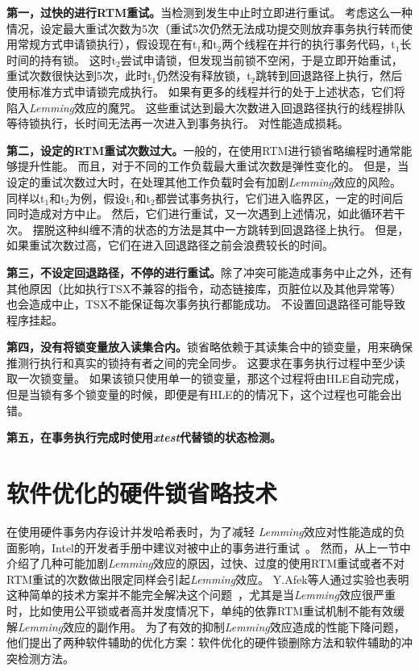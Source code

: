 \textbf{第一，过快的进行RTM重试。}当检测到发生中止时立即进行重试。
考虑这么一种情况，设定最大重试次数为5次（重试5次仍然无法成功提交则放弃事务执行转而使用常规方式申请锁执行），假设现在有t$_1$和t$_2$两个线程在并行的执行事务代码，t$_1$长时间的持有锁。
这时t$_2$尝试申请锁，但发现当前锁不空闲，于是立即开始重试，重试次数很快达到5次，此时t$_1$仍然没有释放锁，t$_2$跳转到回退路径上执行，然后使用标准方式申请锁完成执行。
如果有更多的线程并行的处于上述状态，它们将陷入\textit{Lemming}效应的魔咒。
这些重试达到最大次数进入回退路径执行的线程排队等待锁执行，长时间无法再一次进入到事务执行。
对性能造成损耗。

\textbf{第二，设定的RTM重试次数过大。}一般的，在使用RTM进行锁省略编程时通常能够提升性能。
而且，对于不同的工作负载最大重试次数是弹性变化的。
但是，当设定的重试次数过大时，在处理其他工作负载时会有加剧\textit{Lemming}效应的风险。
同样以t$_1$和t$_2$为例，假设t$_1$和t$_2$都尝试事务执行，它们进入临界区，一定的时间后同时造成对方中止。
然后，它们进行重试，又一次遇到上述情况，如此循环若干次。
摆脱这种纠缠不清的状态的方法是其中一方跳转到回退路径上执行。
但是，如果重试次数过高，它们在进入回退路径之前会浪费较长的时间。

\textbf{第三，不设定回退路径，不停的进行重试。}除了冲突可能造成事务中止之外，还有其他原因（比如执行TSX不兼容的指令，动态链接库，页脏位以及其他异常等）也会造成中止，TSX不能保证每次事务执行都能成功。
不设置回退路径可能导致程序挂起。

\textbf{第四，没有将锁变量放入读集合内。}锁省略依赖于其读集合中的锁变量，用来确保推测行执行和真实的锁持有者之间的完全同步。
这要求在事务执行过程中至少读取一次锁变量。
如果该锁只使用单一的锁变量，那这个过程将由HLE自动完成，但是当锁有多个锁变量的时候，即便是有HLE的的情况下，这个过程也可能会出错。

\textbf{第五，在事务执行完成时使用\textit{xtest}代替锁的状态检测。}

\section{软件优化的硬件锁省略技术}

在使用硬件事务内存设计并发哈希表时，为了减轻
\textit{Lemming}效应对性能造成的负面影响，Intel的开发者手册中建议对被中止的事务进行重试~\cite{Intel2015Intel}。
然而，从上一节中介绍了几种可能加剧\textit{Lemming}效应的原因，过快、过度的使用RTM重试或者不对RTM重试的次数做出限定同样会引起\textit{Lemming}效应。
Y.Afek等人通过实验也表明这种简单的技术方案并不能完全解决这个问题~\cite{Afek2014Software}，尤其是当\textit{Lemming}效应很严重时，比如使用公平锁或者高并发度情况下，单纯的依靠RTM重试机制不能有效缓解\textit{Lemming}效应的副作用。
为了有效的抑制\textit{Lemming}效应造成的性能下降问题，他们提出了两种软件辅助的优化方案：软件优化的硬件锁删除方法和软件辅助的冲突检测方法。

